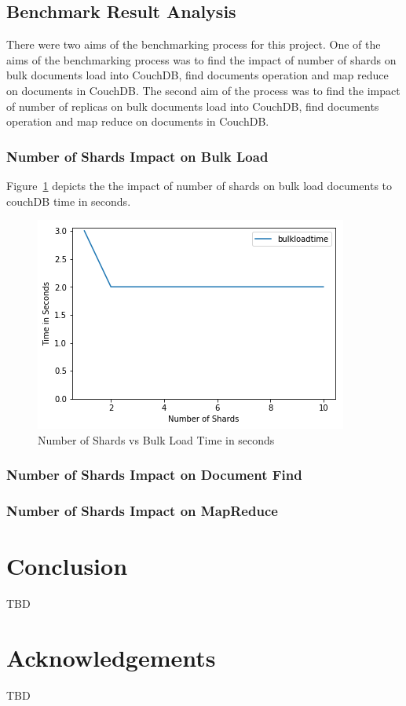 \subsection{Benchmark Result Analysis}
There were two aims of the benchmarking process for this project. One
of the aims of the benchmarking process was to find the impact of
number of shards on bulk documents load into CouchDB, find documents
operation and map reduce on documents in CouchDB. The second aim of
the process was to find the impact of number of replicas on bulk
documents load into CouchDB, find documents operation and map reduce
on documents in CouchDB. 

\subsubsection{Number of Shards Impact on Bulk Load}

Figure~\ref{f:shard-bulk} depicts the the impact of number of shards
on bulk load documents to couchDB time in seconds.
\begin{figure}[!ht]
  \centering\includegraphics[width=\columnwidth]{../images/ShardsBulkLoad.png}
  \caption{Number of Shards vs Bulk Load Time in seconds }\label{f:shard-bulk}
\end{figure}



\subsubsection{Number of Shards Impact on Document Find}
\subsubsection{Number of Shards Impact on MapReduce}


\section{Conclusion}
TBD
\section*{Acknowledgements}

TBD


 





